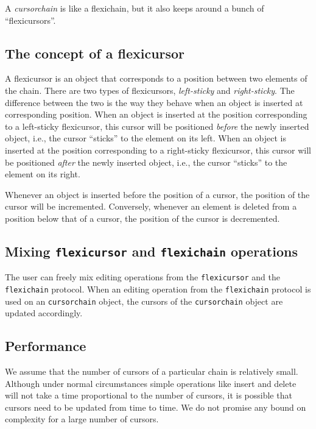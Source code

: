 \documentclass[11pt]{article}
\begin{document}
A \textit{cursorchain} is like a flexichain, but it also keeps around
a bunch of ``flexicursors''.

\subsection{The concept of a flexicursor} 

A flexicursor is an object that corresponds to a position between two
elements of the chain.  There are two types of flexicursors,
\emph{left-sticky} and \emph{right-sticky}.  The difference between
the two is the way they behave when an object is inserted at
corresponding position. When an object is inserted at the position
corresponding to a left-sticky flexicursor, this cursor will be
positioned \emph{before} the newly inserted object, i.e., the cursor
``sticks'' to the element on its left.  When an object is inserted at
the position corresponding to a right-sticky flexicursor, this cursor
will be positioned \emph{after} the newly inserted object, i.e., the
cursor ``sticks'' to the element on its right.

Whenever an object is inserted before the position of a
cursor, the position of the cursor will be incremented.  Conversely,
whenever an element is deleted from a position below that of a cursor,
the position of the cursor is decremented.

\subsection{Mixing \texttt{flexicursor} and \texttt{flexichain} operations}

The user can freely mix editing operations from the
\texttt{flexicursor} and the \texttt{flexichain} protocol.  When an
editing operation from the \texttt{flexichain} protocol is used on an
\texttt{cursorchain} object, the cursors of the \texttt{cursorchain}
object are updated accordingly.

\subsection{Performance}

We assume that the number of cursors of a particular chain is
relatively small.  Although under normal circumstances simple
operations like insert and delete will not take a time proportional to
the number of cursors, it is possible that cursors need to be
updated from time to time.  We do not promise any bound on complexity
for a large number of cursors.
\end{document}
